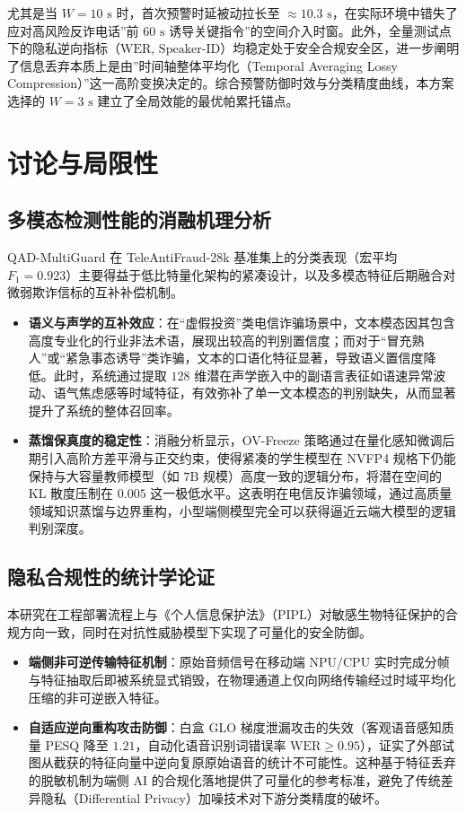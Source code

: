 \documentclass[11pt, a4paper]{article}
\begin{document}
尤其是当 $W = 10\text{ s}$ 时，首次预警时延被动拉长至 $\approx 10.3\text{ s}$，在实际环境中错失了应对高风险反诈电话”前 $60\text{ s}$ 诱导关键指令”的空间介入时窗。此外，全量测试点下的隐私逆向指标（$\mathrm{WER}$, $\mathrm{Speaker\text{-}ID}$）均稳定处于安全合规安全区，进一步阐明了信息丢弃本质上是由”时间轴整体平均化（Temporal Averaging Lossy Compression）”这一高阶变换决定的。综合预警防御时效与分类精度曲线，本方案选择的 $W = 3\text{ s}$ 建立了全局效能的最优帕累托锚点。


\section{讨论与局限性}
\subsection{多模态检测性能的消融机理分析}

QAD-MultiGuard 在 TeleAntiFraud-28k 基准集上的分类表现（宏平均 $F_1 = 0.923$）主要得益于低比特量化架构的紧凑设计，以及多模态特征后期融合对微弱欺诈信标的互补补偿机制。

\begin{itemize}
    \item \textbf{语义与声学的互补效应}：在“虚假投资”类电信诈骗场景中，文本模态因其包含高度专业化的行业非法术语，展现出较高的判别置信度；而对于“冒充熟人”或“紧急事态诱导”类诈骗，文本的口语化特征显著，导致语义置信度降低。此时，系统通过提取 $128$ 维潜在声学嵌入中的副语言表征如语速异常波动、语气焦虑感等时域特征，有效弥补了单一文本模态的判别缺失，从而显著提升了系统的整体召回率。
    \item \textbf{蒸馏保真度的稳定性}：消融分析显示，OV-Freeze 策略通过在量化感知微调后期引入高阶方差平滑与正交约束，使得紧凑的学生模型在 NVFP4 规格下仍能保持与大容量教师模型（如 $7\mathrm{B}$ 规模）高度一致的逻辑分布，将潜在空间的 KL 散度压制在 $0.005$ 这一极低水平。这表明在电信反诈骗领域，通过高质量领域知识蒸馏与边界重构，小型端侧模型完全可以获得逼近云端大模型的逻辑判别深度。
\end{itemize}

\subsection{隐私合规性的统计学论证}

本研究在工程部署流程上与《个人信息保护法》（PIPL）对敏感生物特征保护的合规方向一致，同时在对抗性威胁模型下实现了可量化的安全防御。

\begin{itemize}
    \item \textbf{端侧非可逆传输特征机制}：原始音频信号在移动端 NPU/CPU 实时完成分帧与特征抽取后即被系统显式销毁，在物理通道上仅向网络传输经过时域平均化压缩的非可逆嵌入特征。
    \item \textbf{自适应逆向重构攻击防御}：白盒 GLO 梯度泄漏攻击的失效（客观语音感知质量 PESQ 降至 $1.21$，自动化语音识别词错误率 $\mathrm{WER} \ge 0.95$），证实了外部试图从截获的特征向量中逆向复原原始语音的统计不可能性。这种基于特征丢弃的脱敏机制为端侧 AI 的合规化落地提供了可量化的参考标准，避免了传统差异隐私（Differential Privacy）加噪技术对下游分类精度的破坏。
\end{itemize}
\end{document}
